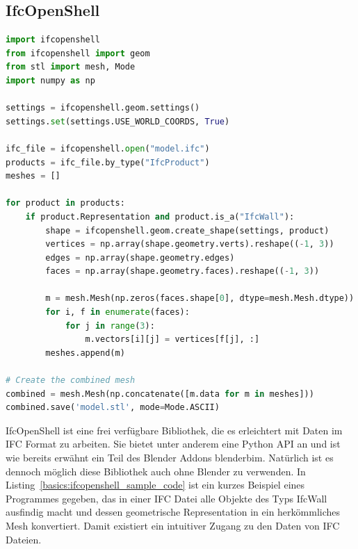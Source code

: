 \subsection{IfcOpenShell}\label{basics:ifcopenshell}
\begin{lstlisting}[label={basics:ifcopenshell_sample_code}, language=Python, caption=Beispielprogramm zur Extraktion bestimmter Daten einer IFC Datei und Generierung eines Meshes aus deren geometrischen Representationen.]
import ifcopenshell
from ifcopenshell import geom
from stl import mesh, Mode
import numpy as np

settings = ifcopenshell.geom.settings()
settings.set(settings.USE_WORLD_COORDS, True)

ifc_file = ifcopenshell.open("model.ifc")
products = ifc_file.by_type("IfcProduct")
meshes = []

for product in products:
    if product.Representation and product.is_a("IfcWall"):
        shape = ifcopenshell.geom.create_shape(settings, product)
        vertices = np.array(shape.geometry.verts).reshape((-1, 3))
        edges = np.array(shape.geometry.edges)
        faces = np.array(shape.geometry.faces).reshape((-1, 3))

        m = mesh.Mesh(np.zeros(faces.shape[0], dtype=mesh.Mesh.dtype))
        for i, f in enumerate(faces):
            for j in range(3):
                m.vectors[i][j] = vertices[f[j], :]
        meshes.append(m)

# Create the combined mesh
combined = mesh.Mesh(np.concatenate([m.data for m in meshes]))
combined.save('model.stl', mode=Mode.ASCII)
\end{lstlisting}

IfcOpenShell ist eine frei verfügbare Bibliothek, die es erleichtert mit Daten im IFC Format zu arbeiten.
Sie bietet unter anderem eine Python API an und ist wie bereits erwähnt ein Teil des Blender Addons blenderbim.
Natürlich ist es dennoch möglich diese Bibliothek auch ohne Blender zu verwenden.
In Listing~\ref{basics:ifcopenshell_sample_code} ist ein kurzes Beispiel eines Programmes gegeben, das in einer IFC Datei alle Objekte des Typs IfcWall ausfindig macht und dessen geometrische Representation in ein herkömmliches Mesh konvertiert.
Damit existiert ein intuitiver Zugang zu den Daten von IFC Dateien.


